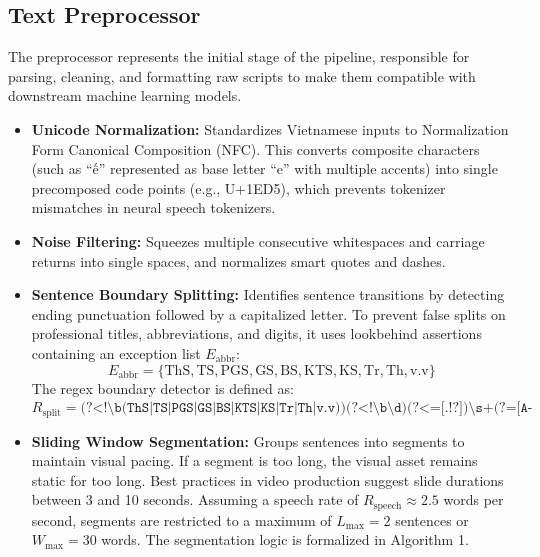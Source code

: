 \documentclass[a4paper,12pt]{report}
\begin{document}
\subsection{Text Preprocessor}
The preprocessor represents the initial stage of the pipeline, responsible for parsing, cleaning, and formatting raw scripts to make them compatible with downstream machine learning models.
\begin{itemize}
    \item \textbf{Unicode Normalization:} Standardizes Vietnamese inputs to Normalization Form Canonical Composition (NFC). This converts composite characters (such as ``ế'' represented as base letter ``e'' with multiple accents) into single precomposed code points (e.g., U+1ED5), which prevents tokenizer mismatches in neural speech tokenizers.
    \item \textbf{Noise Filtering:} Squeezes multiple consecutive whitespaces and carriage returns into single spaces, and normalizes smart quotes and dashes.
    \item \textbf{Sentence Boundary Splitting:} Identifies sentence transitions by detecting ending punctuation followed by a capitalized letter. To prevent false splits on professional titles, abbreviations, and digits, it uses lookbehind assertions containing an exception list $E_{\text{abbr}}$:
    \begin{equation}
        E_{\text{abbr}} = \{\text{ThS}, \text{TS}, \text{PGS}, \text{GS}, \text{BS}, \text{KTS}, \text{KS}, \text{Tr}, \text{Th}, \text{v.v}\}
    \end{equation}
    The regex boundary detector is defined as:
    \begin{equation}
        R_{\text{split}} = \texttt{(?<!\textbackslash b(ThS|TS|PGS|GS|BS|KTS|KS|Tr|Th|v.v))(?<!\textbackslash b\textbackslash d)(?<=[.!?])\textbackslash s+(?=[A-ZÀÁÂÃÈÉÊÌÍÒÓÔÕÙÚÝĂĐĨŨƠƯ])}
    \end{equation}
    \item \textbf{Sliding Window Segmentation:} Groups sentences into segments to maintain visual pacing. If a segment is too long, the visual asset remains static for too long. Best practices in video production suggest slide durations between 3 and 10 seconds. Assuming a speech rate of $R_{\text{speech}} \approx 2.5$ words per second, segments are restricted to a maximum of $L_{\text{max}} = 2$ sentences or $W_{\text{max}} = 30$ words. The segmentation logic is formalized in Algorithm 1.
\end{itemize}
\end{document}
